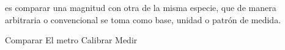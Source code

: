 
\question \fillin \enspace es comparar una magnitud con otra de la misma
  especie, que de manera arbitraria o convencional se toma como base, unidad
  o patrón de medida.

  \begin{oneparchoices}
    \choice Comparar
    \choice El metro
    \choice Calibrar
    \CorrectChoice Medir
  \end{oneparchoices}
  \answerline[D]
